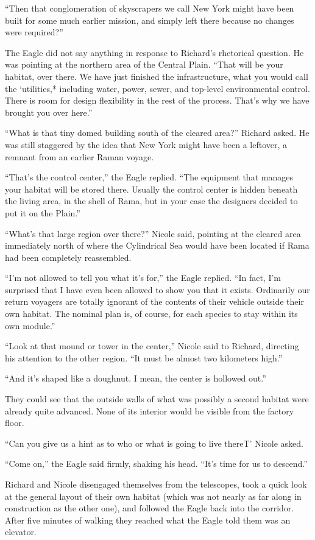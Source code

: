 \documentclass[]{article}
\begin{document}
{“Then that conglomeration of skyscrapers we call New York might have been built for some much earlier mission, and simply left there because no changes were required?”

The Eagle did not say anything in response to Richard’s rhetorical question. He was pointing at the northern area of the Central Plain. “That will be your habitat, over there. We have just finished the infrastructure, what you would call the ‘utilities,* including water, power, sewer, and top-level environmental control. There is room for design flexibility in the rest of the process. That’s why we have brought you over here.”

“What is that tiny domed building south of the cleared area?” Richard asked. He was still staggered by the idea that New York might have been a leftover, a remnant from an earlier Raman voyage.

“That’s the control center,” the Eagle replied. “The equipment that manages your habitat will be stored there. Usually the control center is hidden beneath the living area, in the shell of Rama, but in your case the designers decided to put it on the Plain.”

“What’s that large region over there?” Nicole said, pointing at the cleared area immediately north of where the Cylindrical Sea would have been located if Rama had been completely reassembled.

“I’m not allowed to tell you what it’s for,” the Eagle replied. “In fact, I’m surprised that I have even been allowed to show you that it exists. Ordinarily our return voyagers are totally ignorant of the contents of their vehicle outside their own habitat. The nominal plan is, of course, for each species to stay within its own module.”

“Look at that mound or tower in the center,” Nicole said to Richard, directing his attention to the other region. “It must be almost two kilometers high.”

“And it’s shaped like a doughnut. I mean, the center is hollowed out.”

They could see that the outside walls of what was possibly a second habitat were already quite advanced. None of its interior would be visible from the factory floor.

“Can you give us a hint as to who or what is going to live thereT’ Nicole asked.

“Come on,” the Eagle said firmly, shaking his head. “It’s time for us to descend.”

Richard and Nicole disengaged themselves from the telescopes, took a quick look at the general layout of their own habitat (which was not nearly as far along in construction as the other one), and followed the Eagle back into the corridor. After five minutes of walking they reached what the Eagle told them was an elevator.

}
\end{document}
